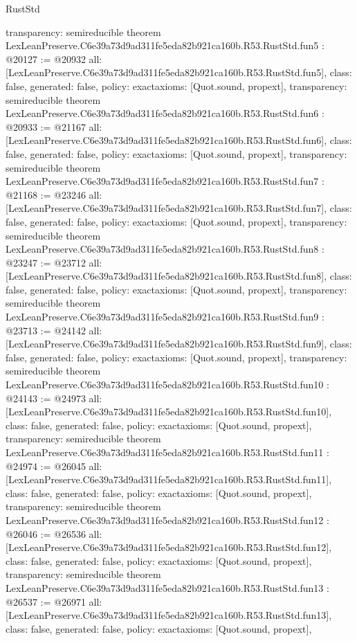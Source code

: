 \begin{lexlean}{RustStd}
\begin{coremodule}
{  transparency: semireducible
}
theorem LexLeanPreserve.C6e39a73d9ad311fe5eda82b921ca160b.R53.RustStd.fun5 : @20127 := @20932 {
  all: [LexLeanPreserve.C6e39a73d9ad311fe5eda82b921ca160b.R53.RustStd.fun5],
  class: false,
  generated: false,
  policy: exact{axioms: [Quot.sound, propext]},
  transparency: semireducible
}
theorem LexLeanPreserve.C6e39a73d9ad311fe5eda82b921ca160b.R53.RustStd.fun6 : @20933 := @21167 {
  all: [LexLeanPreserve.C6e39a73d9ad311fe5eda82b921ca160b.R53.RustStd.fun6],
  class: false,
  generated: false,
  policy: exact{axioms: [Quot.sound, propext]},
  transparency: semireducible
}
theorem LexLeanPreserve.C6e39a73d9ad311fe5eda82b921ca160b.R53.RustStd.fun7 : @21168 := @23246 {
  all: [LexLeanPreserve.C6e39a73d9ad311fe5eda82b921ca160b.R53.RustStd.fun7],
  class: false,
  generated: false,
  policy: exact{axioms: [Quot.sound, propext]},
  transparency: semireducible
}
theorem LexLeanPreserve.C6e39a73d9ad311fe5eda82b921ca160b.R53.RustStd.fun8 : @23247 := @23712 {
  all: [LexLeanPreserve.C6e39a73d9ad311fe5eda82b921ca160b.R53.RustStd.fun8],
  class: false,
  generated: false,
  policy: exact{axioms: [Quot.sound, propext]},
  transparency: semireducible
}
theorem LexLeanPreserve.C6e39a73d9ad311fe5eda82b921ca160b.R53.RustStd.fun9 : @23713 := @24142 {
  all: [LexLeanPreserve.C6e39a73d9ad311fe5eda82b921ca160b.R53.RustStd.fun9],
  class: false,
  generated: false,
  policy: exact{axioms: [Quot.sound, propext]},
  transparency: semireducible
}
theorem LexLeanPreserve.C6e39a73d9ad311fe5eda82b921ca160b.R53.RustStd.fun10 : @24143 := @24973 {
  all: [LexLeanPreserve.C6e39a73d9ad311fe5eda82b921ca160b.R53.RustStd.fun10],
  class: false,
  generated: false,
  policy: exact{axioms: [Quot.sound, propext]},
  transparency: semireducible
}
theorem LexLeanPreserve.C6e39a73d9ad311fe5eda82b921ca160b.R53.RustStd.fun11 : @24974 := @26045 {
  all: [LexLeanPreserve.C6e39a73d9ad311fe5eda82b921ca160b.R53.RustStd.fun11],
  class: false,
  generated: false,
  policy: exact{axioms: [Quot.sound, propext]},
  transparency: semireducible
}
theorem LexLeanPreserve.C6e39a73d9ad311fe5eda82b921ca160b.R53.RustStd.fun12 : @26046 := @26536 {
  all: [LexLeanPreserve.C6e39a73d9ad311fe5eda82b921ca160b.R53.RustStd.fun12],
  class: false,
  generated: false,
  policy: exact{axioms: [Quot.sound, propext]},
  transparency: semireducible
}
theorem LexLeanPreserve.C6e39a73d9ad311fe5eda82b921ca160b.R53.RustStd.fun13 : @26537 := @26971 {
  all: [LexLeanPreserve.C6e39a73d9ad311fe5eda82b921ca160b.R53.RustStd.fun13],
  class: false,
  generated: false,
  policy: exact{axioms: [Quot.sound, propext]},
}
\end{coremodule}
\end{lexlean}
